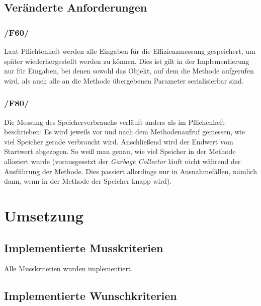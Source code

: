\documentclass[a4paper]{report}
\begin{document}
\section{Veränderte Anforderungen}

\subsection{/F60/}

Laut Pflichtenheft werden alle Eingaben für die Effizienzmessung gespeichert, um später wiederhergestellt werden zu können. Dies ist gilt in der Implementierung nur für Eingaben, bei denen sowohl das Objekt, auf dem die Methode aufgerufen wird, als auch alle an die Methode übergebenen Parameter serialisierbar sind.

\subsection{/F80/}
\label{F80}

Die Messung des Speicherverbrauchs verläuft anders als im Pflichenheft beschrieben: Es wird jeweils vor und nach dem Methodenaufruf gemessen, wie viel Speicher gerade verbraucht wird. Anschließend wird der Endwert vom Startwert abgezogen. So weiß man genau, wie viel Speicher in der Methode alloziert wurde (vorausgesetzt der \emph{Garbage Collector} läuft nicht während der Ausführung der Methode. Dies passiert allerdings nur in Ausnahmefällen, nämlich dann, wenn in der Methode der Speicher knapp wird).

\chapter{Umsetzung}

\section{Implementierte Musskriterien}

Alle Musskriterien wurden implementiert.

\section{Implementierte Wunschkriterien}
\end{document}
